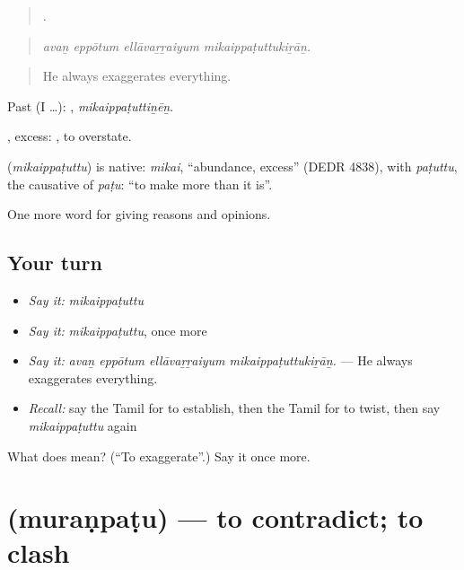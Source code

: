 \begin{quote}
   .
\end{quote}

\begin{quote}
\emph{avaṉ eppōtum ellāvaṟṟaiyum mikaippaṭuttukiṟāṉ.}
\end{quote}

\begin{quote}
He always exaggerates everything.
\end{quote}

Past (I …): , \emph{mikaippaṭuttiṉēṉ}.

, excess:  , to overstate.

\begin{cousinweb}
\textbf{} (\emph{mikaippaṭuttu}) is native: \emph{mikai}, \textquotedblleft{}abundance, excess\textquotedblright{} (DEDR 4838), with \emph{paṭuttu}, the causative of \emph{paṭu}: \textquotedblleft{}to make more than it is\textquotedblright{}.
\end{cousinweb}

\begin{grammarlens}[title={What you've built}]
One more word for giving reasons and opinions.
\end{grammarlens}

\subsection*{Your turn}
\begin{itemize}
\raggedright
  \item \emph{Say it:} \emph{mikaippaṭuttu}
  \item \emph{Say it:} \emph{mikaippaṭuttu}, once more
  \item \emph{Say it:} \emph{avaṉ eppōtum ellāvaṟṟaiyum mikaippaṭuttukiṟāṉ.} — He always exaggerates everything.
  \item \emph{Recall:} say the Tamil for to establish, then the Tamil for to twist, then say \emph{mikaippaṭuttu} again
\end{itemize}

\begin{tcolorbox}[breakable,colback=teal!4,colframe=teal!35!black,title={Before you move on}]
What does  mean? (\textquotedblleft{}To exaggerate\textquotedblright{}.) Say it once more.
\end{tcolorbox}
\section[\texorpdfstring{\ta{முரண்படு} (muraṇpaṭu)}{முரண்படு (muraṇpaṭu)}]{ (muraṇpaṭu) — to contradict; to clash}

